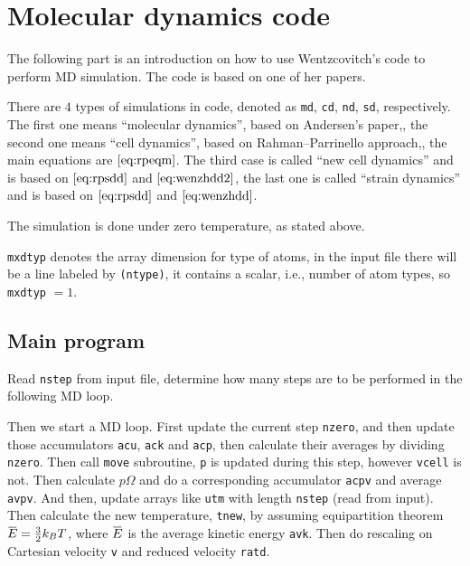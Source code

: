 
\section{Molecular dynamics code}

The following part is an introduction on how to use
Wentzcovitch's code to perform MD simulation. The code is
based on one of her papers.\cite{Wentzcovitch:1991ka}

There are $4$ types of simulations in code,
denoted as \texttt{md}, \texttt{cd}, \texttt{nd}, \texttt{sd},
respectively. The first one means ``molecular dynamics'',
based on Andersen's paper,\cite{Andersen:1980ew},
the second one means ``cell dynamics'', based on
Rahman–Parrinello approach,\cite{Parrinello:1980kx},
the main equations are $\eqref{eq:rpeqm}$.
The third case is called ``new cell dynamics'' and is based on
$\eqref{eq:rpsdd}$ and $\eqref{eq:wenzhdd2}$,
the last one is called ``strain dynamics'' and is based on
$\eqref{eq:rpsdd}$ and $\eqref{eq:wenzhdd}$.

The simulation is done under zero temperature, as stated above.

\texttt{mxdtyp} denotes the array dimension for type of atoms,
in the input file there will be a line labeled by \texttt{(ntype)}, it
contains a scalar, i.e., number of atom types, so \texttt{mxdtyp} $=1$.

\subsection{Main program}

Read \texttt{nstep} from input file, determine how many steps are
to be performed in the following MD loop.

Then we start a MD loop.
First update the current step \texttt{nzero}, and then update those
accumulators \texttt{acu}, \texttt{ack} and \texttt{acp}, then calculate
their averages by dividing \texttt{nzero}. Then call \texttt{move} subroutine,
\texttt{p} is updated during this step, however \texttt{vcell} is not.
Then calculate $p \Omega$ and do a corresponding accumulator \texttt{acpv} and
average \texttt{avpv}. And then, update arrays like \texttt{utm} with length
\texttt{nstep} (read from input). 
Then calculate the new temperature, \texttt{tnew}, by assuming equipartition 
theorem $\mean{E} = \frac{ 3 }{ 2 } k_B T$, where $\mean{E}$ is
the average kinetic energy \texttt{avk}.
Then do rescaling on Cartesian velocity \texttt{v} and reduced velocity
\texttt{ratd}.

